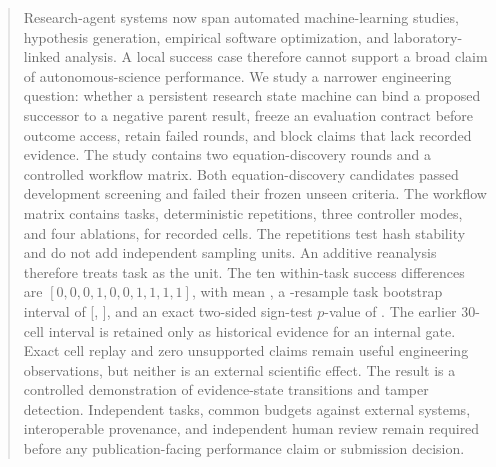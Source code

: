 \begin{abstract}
Research-agent systems now span automated machine-learning studies,
hypothesis generation, empirical software optimization, and laboratory-linked
analysis. A local success case therefore cannot support a broad claim of
autonomous-science performance. We study a narrower engineering question:
whether a persistent research state machine can bind a proposed successor to
a negative parent result, freeze an evaluation contract before outcome
access, retain failed rounds, and block claims that lack recorded evidence.
The study contains two equation-discovery rounds and a controlled workflow
matrix. Both equation-discovery candidates passed development screening and
failed their frozen unseen criteria. The workflow matrix contains
\TaskCount{} tasks, \IdempotencyRepeatCount{} deterministic repetitions,
three controller modes, and four ablations, for \CellCount{} recorded cells.
The repetitions test hash stability and do not add independent sampling
units. An additive reanalysis therefore treats task as the unit. The ten
within-task success differences are
\([0,0,0,1,0,0,1,1,1,1]\), with mean \TaskLevelGain{}, a
\BootstrapResamples{}-resample task bootstrap interval of
[\TaskLevelCILower{}, \TaskLevelCIUpper{}], and an exact two-sided sign-test
\(p\)-value of \SignTestTwoSided{}. The earlier 30-cell interval is retained
only as historical evidence for an internal gate. Exact cell replay and zero
unsupported claims remain useful engineering observations, but neither is an
external scientific effect. The result is a controlled demonstration of
evidence-state transitions and tamper detection. Independent tasks, common
budgets against external systems, interoperable provenance, and independent
human review remain required before any publication-facing performance
claim or submission decision.
\end{abstract}
